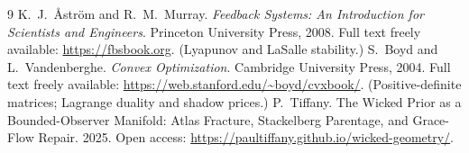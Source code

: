 \documentclass[11pt]{article}
\theoremstyle{plain}
\theoremstyle{definition}
\theoremstyle{remark}
\begin{document}
\medskip
{}

\begin{thebibliography}{9}
 K.~J.~\AA{}str\"om and R.~M.~Murray. \emph{Feedback Systems: An
  Introduction for Scientists and Engineers}. Princeton University Press, 2008.
  Full text freely available: \url{https://fbsbook.org}. (Lyapunov and LaSalle stability.)
 S.~Boyd and L.~Vandenberghe. \emph{Convex Optimization}. Cambridge
  University Press, 2004. Full text freely available:
  \url{https://web.stanford.edu/~boyd/cvxbook/}. (Positive-definite matrices; Lagrange
  duality and shadow prices.)
 P.~Tiffany. The Wicked Prior as a Bounded-Observer Manifold:
  Atlas Fracture, Stackelberg Parentage, and Grace-Flow Repair. 2025. Open access:
  \url{https://paultiffany.github.io/wicked-geometry/}.
\end{thebibliography}
\end{document}

